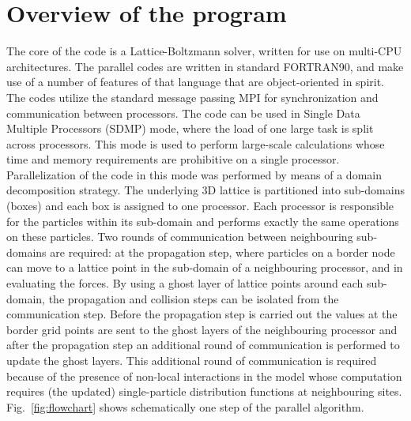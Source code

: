 \documentclass[a4paper]{article}
\begin{document}
\section{Overview of the program}
The core of the code is a Lattice-Boltzmann solver, written for use on
multi-CPU architectures.  The parallel codes are written in standard FORTRAN90,
and make use of a number of features of that language that are object-oriented
in spirit.  The codes utilize the standard message passing MPI for
synchronization and communication between processors.  The code can be used in
Single Data Multiple Processors (SDMP) mode, where the load of one large task
is split across processors. This mode is used to perform large-scale
calculations whose time and memory requirements are prohibitive on a single
processor.  Parallelization of the code in this mode was performed by means of
a domain decomposition strategy.  The underlying 3D lattice is partitioned into
sub-domains (boxes) and  each box is assigned to one processor.  Each processor
is responsible for the particles within its sub-domain and performs exactly the
same operations on these particles.  Two rounds of communication between
neighbouring sub-domains are required: at the propagation step,  where
particles on a border node can move to a lattice point in the sub-domain of a
neighbouring processor, and in evaluating the forces.  By using a ghost layer
of lattice points around each sub-domain, the propagation and collision steps
can be isolated from the communication step. Before the propagation step is
carried out the values at the border grid points are sent to the ghost layers
of the neighbouring processor and  after the propagation step an additional
round of communication is performed to update the ghost layers. This additional
round of communication is  required because of the presence of  non-local
interactions in the model whose computation requires (the updated)
single-particle distribution functions at neighbouring sites.
Fig.~\ref{fig:flowchart}
shows schematically one step of the parallel algorithm.
\end{document}
